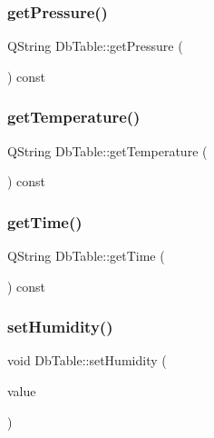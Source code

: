 \subsubsection{\texorpdfstring{get\+Pressure()}{getPressure()}}
{\footnotesize\ttfamily Q\+String Db\+Table\+::get\+Pressure (\begin{DoxyParamCaption}{ }\end{DoxyParamCaption}) const}

\mbox{\label{class_db_table_a7c3362a6fe703dc2c5fa3e217c52792f}} 
\subsubsection{\texorpdfstring{get\+Temperature()}{getTemperature()}}
{\footnotesize\ttfamily Q\+String Db\+Table\+::get\+Temperature (\begin{DoxyParamCaption}{ }\end{DoxyParamCaption}) const}

\mbox{\label{class_db_table_aeffff61ff7c3a76e04bde211be25860f}} 
\subsubsection{\texorpdfstring{get\+Time()}{getTime()}}
{\footnotesize\ttfamily Q\+String Db\+Table\+::get\+Time (\begin{DoxyParamCaption}{ }\end{DoxyParamCaption}) const}

\mbox{\label{class_db_table_a355eec4c57189589d85c5319b18a1b38}} 
\subsubsection{\texorpdfstring{set\+Humidity()}{setHumidity()}}
{\footnotesize\ttfamily void Db\+Table\+::set\+Humidity (\begin{DoxyParamCaption}\item[{const Q\+String \&}]{value }\end{DoxyParamCaption})}

